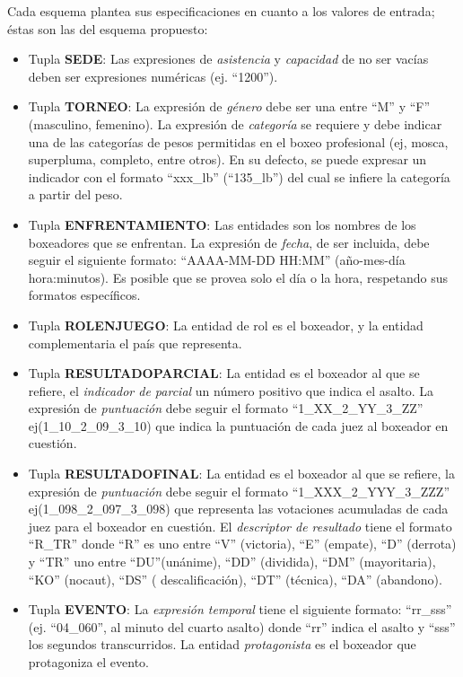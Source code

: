     Cada esquema plantea sus especificaciones en cuanto a los valores de entrada; éstas son las del esquema propuesto:

    \begin{itemize}
        \item Tupla \textbf{SEDE}: Las expresiones de \textit{asistencia} y \textit{capacidad} de no ser vacías deben ser expresiones numéricas (ej. “1200”).
        \item Tupla \textbf{TORNEO}: La expresión de \textit{género} debe ser una entre “M” y “F” (masculino, femenino). La expresión de \textit{categoría} se requiere 
        y debe indicar una de las categorías de pesos permitidas en el boxeo profesional (ej, mosca, superpluma, completo, entre otros). En su defecto, se puede expresar un indicador con 
        el formato “xxx\_lb” (“135\_lb”) del cual se infiere la categoría a partir del peso.
        \item Tupla \textbf{ENFRENTAMIENTO}: Las entidades son los nombres de los boxeadores que se enfrentan. La expresión de \textit{fecha}, de ser incluida, debe seguir
        el siguiente formato: “AAAA-MM-DD HH:MM” (año-mes-día hora:minutos). Es posible que se provea solo el día o la hora, respetando sus formatos específicos.
        \item Tupla \textbf{ROLENJUEGO}: La entidad de rol es el boxeador, y la entidad complementaria el país que representa.
        \item Tupla \textbf{RESULTADOPARCIAL}: La entidad es el boxeador al que se refiere, el \textit{indicador de parcial} un número positivo que indica el asalto. La expresión de \textit{puntuación} 
        debe seguir el formato  “1\_XX\_2\_YY\_3\_ZZ” ej(1\_10\_2\_09\_3\_10) que indica la puntuación de cada juez al boxeador en cuestión.
        \item Tupla \textbf{RESULTADOFINAL}: La entidad es el boxeador al que se refiere, la expresión de \textit{puntuación} debe seguir el formato  “1\_XXX\_2\_YYY\_3\_ZZZ” ej(1\_098\_2\_097\_3\_098)
        que representa las votaciones acumuladas de cada juez para el boxeador en cuestión. El \textit{descriptor de resultado} tiene el formato “R\_TR” donde “R” es uno entre “V” (victoria), “E” (empate),
        “D” (derrota) y “TR” uno entre “DU”(unánime), “DD” (dividida), “DM” (mayoritaria), “KO” (nocaut), “DS” ( descalificación), “DT” (técnica), “DA” (abandono).
        \item Tupla \textbf{EVENTO}: La \textit{expresión temporal} tiene el siguiente formato: “rr\_sss” (ej. “04\_060”, al minuto del cuarto asalto) donde “rr” indica el asalto y “sss” los segundos transcurridos. 
        La entidad \textit{protagonista} es el boxeador que protagoniza el evento.
    \end{itemize}


